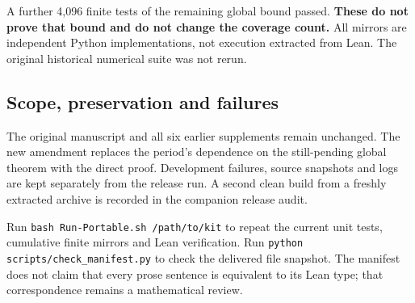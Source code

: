 \documentclass[11pt]{article}
\begin{document}
A further 4,096 finite tests of the remaining global bound passed. \textbf{These do not prove that bound and do not change the coverage count.} All mirrors are independent Python implementations, not execution extracted from Lean. The original historical numerical suite was not rerun.

\subsection*{Scope, preservation and failures}
The original manuscript and all six earlier supplements remain unchanged. The new amendment replaces the period's dependence on the still-pending global theorem with the direct proof. Development failures, source snapshots and logs are kept separately from the release run. A second clean build from a freshly extracted archive is recorded in the companion release audit.

Run \texttt{bash Run-Portable.sh /path/to/kit} to repeat the current unit tests, cumulative finite mirrors and Lean verification. Run \texttt{python scripts/check\_manifest.py} to check the delivered file snapshot. The manifest does not claim that every prose sentence is equivalent to its Lean type; that correspondence remains a mathematical review.
\end{document}
